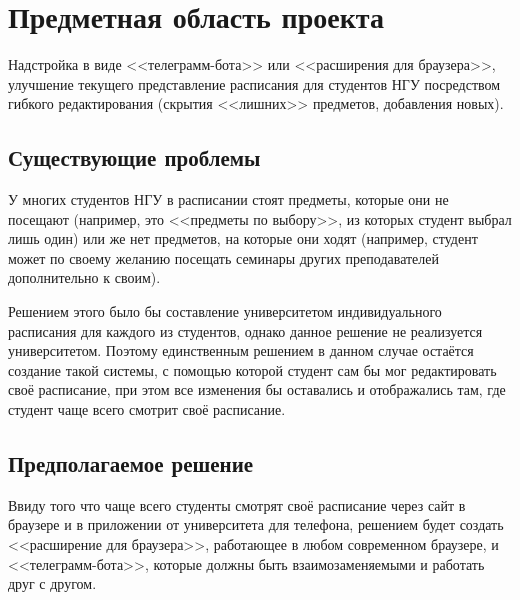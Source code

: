 \chapter{Предметная область проекта}
	Надстройка в виде <<телеграмм-бота>> или <<расширения для браузера>>, улучшение текущего представление расписания для студентов НГУ посредством гибкого редактирования (скрытия <<лишних>> предметов, добавления новых).

	\section{Существующие проблемы}
		У многих студентов НГУ в расписании стоят предметы, которые они не посещают (например, это <<предметы по выбору>>, из которых студент выбрал лишь один) или же нет предметов, на которые они ходят (например, студент может по своему желанию посещать семинары других преподавателей дополнительно к своим).

		Решением этого было бы составление университетом индивидуального расписания для каждого из студентов, однако данное решение не реализуется университетом. Поэтому единственным решением в данном случае остаётся создание такой системы, с помощью которой студент сам бы мог редактировать своё расписание, при этом все изменения бы оставались и отображались там, где студент чаще всего смотрит своё расписание. 
	\section{Предполагаемое решение}
	Ввиду того что чаще всего студенты смотрят своё расписание через сайт в браузере и в приложении от университета для телефона, решением будет создать <<расширение для браузера>>, работающее в любом современном браузере, и <<телеграмм-бота>>, которые должны быть взаимозаменяемыми и работать друг с другом.
